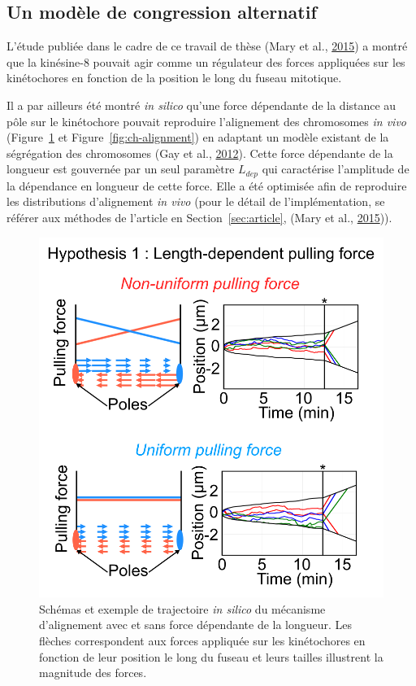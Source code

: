 \documentclass[12pt,a4paper,twoside,openright]{book}
\begin{document}
\subsection{Un modèle de congression
alternatif}\label{un-moduxe8le-de-congression-alternatif}

\label{sec:second-modele}

L'étude publiée dans le cadre de ce travail de thèse (Mary et al.,
\protect\hyperlink{ref-Mary2015}{2015}) a montré que la kinésine-8
pouvait agir comme un régulateur des forces appliquées sur les
kinétochores en fonction de la position le long du fuseau mitotique.

Il a par ailleurs été montré \emph{in silico} qu'une force dépendante de
la distance au pôle sur le kinétochore pouvait reproduire l'alignement
des chromosomes \emph{in vivo} (Figure~\ref{fig:hyp1} et
Figure~\ref{fig:ch-alignment}) en adaptant un modèle existant de la
ségrégation des chromosomes (Gay et al.,
\protect\hyperlink{ref-Gay2012a}{2012}). Cette force dépendante de la
longueur est gouvernée par un seul paramètre \(L_{dep}\) qui caractérise
l'amplitude de la dépendance en longueur de cette force. Elle a été
optimisée afin de reproduire les distributions d'alignement \emph{in
vivo} (pour le détail de l'implémentation, se référer aux méthodes de
l'article en Section~\ref{sec:article}, (Mary et al.,
\protect\hyperlink{ref-Mary2015}{2015})).

\begin{figure}[htbp]
\centering
\includegraphics{figures/results/modelling/hyp1.png}
\caption[Premier mécanisme expliquant l'alignement des chromosomes]{\label{fig:hyp1}Schémas
et exemple de trajectoire \emph{in silico} du mécanisme d'alignement
avec et sans force dépendante de la longueur. Les flèches correspondent
aux forces appliquée sur les kinétochores en fonction de leur position
le long du fuseau et leurs tailles illustrent la magnitude des forces.}
\end{figure}
\end{document}

